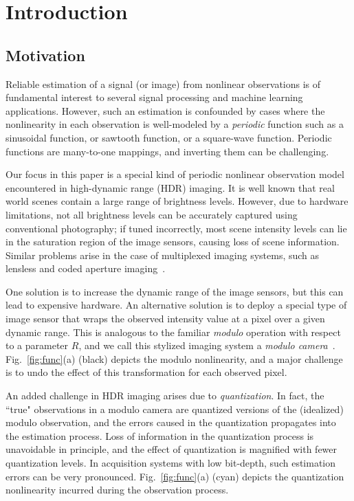 \section{Introduction}
\label{sec:intro}

\subsection{Motivation}

Reliable estimation of a signal (or image) from nonlinear observations is of fundamental interest to several signal processing and machine learning applications. However, such an estimation is confounded by cases where the nonlinearity in each observation is well-modeled by a \emph{periodic} function such as a sinusoidal function, or sawtooth function, or a square-wave function. Periodic functions are many-to-one mappings, and inverting them can be challenging.

Our focus in this paper is a special kind of periodic nonlinear observation model encountered in high-dynamic range (HDR) imaging. It is well known that real world scenes contain a large range of brightness levels. However, due to hardware limitations, not all brightness levels can be accurately captured using conventional photography; if tuned incorrectly, most scene intensity levels can lie in the saturation region of the image sensors, causing loss of scene information. Similar problems arise in the case of multiplexed imaging systems, such as lensless and coded aperture imaging~\cite{codedaperture,asif2017flatcam}.

One solution is to increase the dynamic range of the image sensors, but this can lead to expensive hardware. An alternative solution is to deploy a special type of image sensor that {wraps} the observed intensity value at a pixel over a given dynamic range. This is analogous to the familiar \emph{modulo} operation with respect to a parameter $R$, and we call this stylized imaging system a \emph{modulo camera}~\cite{ICCP15_Zhao}.  
Fig.~\ref{fig:func}(a) (black) depicts the modulo nonlinearity, and a major challenge is to undo the effect of this transformation for each observed pixel.

An added challenge in HDR imaging arises due to \emph{quantization}. In fact, the ``true" observations in a modulo camera are quantized versions of the (idealized) modulo observation, and the errors caused in the quantization propagates into the estimation process. Loss of information in the quantization process is unavoidable in principle, and the effect of quantization is magnified with fewer quantization levels. In acquisition systems with low bit-depth, such estimation errors can be very pronounced. Fig.~\ref{fig:func}(a) (cyan) depicts the quantization nonlinearity incurred during the observation process.

